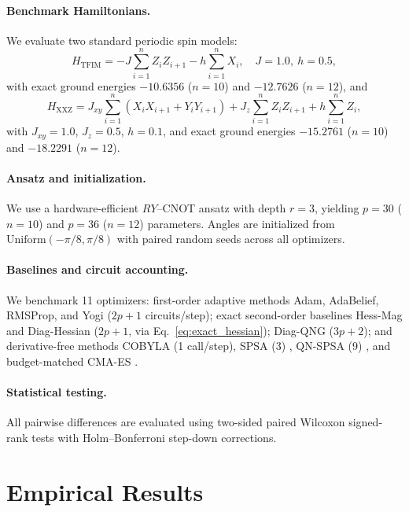 \documentclass[sn-mathphys,Numbered]{sn-jnl}
\theoremstyle{thmstyleone}
\theoremstyle{thmstyletwo}
\theoremstyle{thmstylethree}
\begin{document}
\paragraph{Benchmark Hamiltonians.}
We evaluate two standard periodic spin models:
\begin{equation}
H_{\text{TFIM}} = -J \sum_{i=1}^n Z_i Z_{i+1} - h \sum_{i=1}^n X_i, \quad J = 1.0,\ h = 0.5,
\end{equation}
with exact ground energies $-10.6356$ ($n=10$) and $-12.7626$ ($n=12$), and
\begin{equation}
H_{\text{XXZ}} = J_{xy} \sum_{i=1}^n (X_i X_{i+1} + Y_i Y_{i+1}) + J_z \sum_{i=1}^n Z_i Z_{i+1} + h \sum_{i=1}^n Z_i,
\end{equation}
with $J_{xy}=1.0$, $J_z=0.5$, $h=0.1$, and exact ground energies $-15.2761$ ($n=10$) and $-18.2291$ ($n=12$).

\paragraph{Ansatz and initialization.}
We use a hardware-efficient $RY$--CNOT ansatz with depth $r=3$, yielding $p=30$ ($n=10$) and $p=36$ ($n=12$) parameters. Angles are initialized from $\text{Uniform}(-\pi/8, \pi/8)$ with paired random seeds across all optimizers.

\paragraph{Baselines and circuit accounting.}
We benchmark 11 optimizers: first-order adaptive methods Adam, AdaBelief, RMSProp, and Yogi ($2p+1$ circuits/step); exact second-order baselines Hess-Mag and Diag-Hessian ($2p+1$, via Eq.~\eqref{eq:exact_hessian}); Diag-QNG ($3p+2$); and derivative-free methods COBYLA (1 call/step), SPSA (3) \cite{spall1992multivariate,spall1997accelerated,spall1998implementation,spall2000adaptive}, QN-SPSA (9) \cite{gacon2021simultaneous}, and budget-matched CMA-ES \cite{novak2025benchmarking}.

\paragraph{Statistical testing.}
All pairwise differences are evaluated using two-sided paired Wilcoxon signed-rank tests with Holm--Bonferroni step-down corrections.

\FloatBarrier

\section{Empirical Results}
\label{sec:results}
\end{document}
